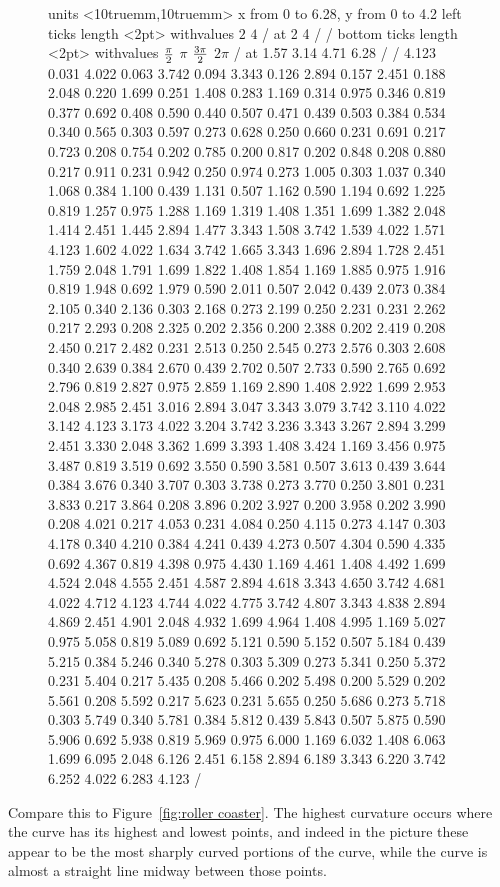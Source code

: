 \begin{example}{}{}
\begin{figure}[H]
\centerline{
\vbox{\beginpicture
\normalgraphs
\setcoordinatesystem units <10truemm,10truemm>
\setplotarea x from 0 to 6.28, y from 0 to 4.2
\axis left ticks length <2pt> withvalues {$2$} {$4$} / at 2 4 / /
\axis bottom ticks length <2pt> withvalues {$\pi\over2$} {$\pi$} 
{$3\pi\over2$} {$2\pi$} / at 1.57 3.14 4.71 6.28 / /
 4.123 0.031 4.022 0.063 3.742 0.094 3.343 0.126 2.894 
0.157 2.451 0.188 2.048 0.220 1.699 0.251 1.408 0.283 1.169 
0.314 0.975 0.346 0.819 0.377 0.692 0.408 0.590 0.440 0.507 
0.471 0.439 0.503 0.384 0.534 0.340 0.565 0.303 0.597 0.273 
0.628 0.250 0.660 0.231 0.691 0.217 0.723 0.208 0.754 0.202 
0.785 0.200 0.817 0.202 0.848 0.208 0.880 0.217 0.911 0.231 
0.942 0.250 0.974 0.273 1.005 0.303 1.037 0.340 1.068 0.384 
1.100 0.439 1.131 0.507 1.162 0.590 1.194 0.692 1.225 0.819 
1.257 0.975 1.288 1.169 1.319 1.408 1.351 1.699 1.382 2.048 
1.414 2.451 1.445 2.894 1.477 3.343 1.508 3.742 1.539 4.022 
1.571 4.123 1.602 4.022 1.634 3.742 1.665 3.343 1.696 2.894 
1.728 2.451 1.759 2.048 1.791 1.699 1.822 1.408 1.854 1.169 
1.885 0.975 1.916 0.819 1.948 0.692 1.979 0.590 2.011 0.507 
2.042 0.439 2.073 0.384 2.105 0.340 2.136 0.303 2.168 0.273 
2.199 0.250 2.231 0.231 2.262 0.217 2.293 0.208 2.325 0.202 
2.356 0.200 2.388 0.202 2.419 0.208 2.450 0.217 2.482 0.231 
2.513 0.250 2.545 0.273 2.576 0.303 2.608 0.340 2.639 0.384 
2.670 0.439 2.702 0.507 2.733 0.590 2.765 0.692 2.796 0.819 
2.827 0.975 2.859 1.169 2.890 1.408 2.922 1.699 2.953 2.048 
2.985 2.451 3.016 2.894 3.047 3.343 3.079 3.742 3.110 4.022 
3.142 4.123 3.173 4.022 3.204 3.742 3.236 3.343 3.267 2.894 
3.299 2.451 3.330 2.048 3.362 1.699 3.393 1.408 3.424 1.169 
3.456 0.975 3.487 0.819 3.519 0.692 3.550 0.590 3.581 0.507 
3.613 0.439 3.644 0.384 3.676 0.340 3.707 0.303 3.738 0.273 
3.770 0.250 3.801 0.231 3.833 0.217 3.864 0.208 3.896 0.202 
3.927 0.200 3.958 0.202 3.990 0.208 4.021 0.217 4.053 0.231 
4.084 0.250 4.115 0.273 4.147 0.303 4.178 0.340 4.210 0.384 
4.241 0.439 4.273 0.507 4.304 0.590 4.335 0.692 4.367 0.819 
4.398 0.975 4.430 1.169 4.461 1.408 4.492 1.699 4.524 2.048 
4.555 2.451 4.587 2.894 4.618 3.343 4.650 3.742 4.681 4.022 
4.712 4.123 4.744 4.022 4.775 3.742 4.807 3.343 4.838 2.894 
4.869 2.451 4.901 2.048 4.932 1.699 4.964 1.408 4.995 1.169 
5.027 0.975 5.058 0.819 5.089 0.692 5.121 0.590 5.152 0.507 
5.184 0.439 5.215 0.384 5.246 0.340 5.278 0.303 5.309 0.273 
5.341 0.250 5.372 0.231 5.404 0.217 5.435 0.208 5.466 0.202 
5.498 0.200 5.529 0.202 5.561 0.208 5.592 0.217 5.623 0.231 
5.655 0.250 5.686 0.273 5.718 0.303 5.749 0.340 5.781 0.384 
5.812 0.439 5.843 0.507 5.875 0.590 5.906 0.692 5.938 0.819 
5.969 0.975 6.000 1.169 6.032 1.408 6.063 1.699 6.095 2.048 
6.126 2.451 6.158 2.894 6.189 3.343 6.220 3.742 6.252 4.022 
6.283 4.123 /
\endpicture}}
\end{figure}

Compare this to Figure~\ref{fig:roller coaster}. The highest
curvature occurs where the curve has its highest and lowest points,
and indeed in the picture these appear to be the most sharply curved
portions of the curve, while the curve is almost a straight line
midway between those points. 
\end{example}

